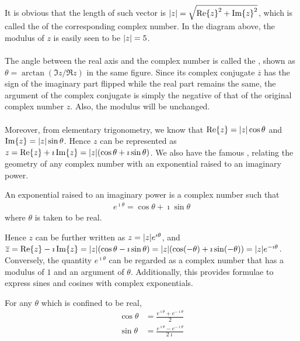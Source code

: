 It is obvious that the length of such vector is $\abs{z} = \sqrt{\Re{z}^2 + \Im{z}^2}$, which is called the  of the corresponding complex number. In the diagram above, the modulus of $z$ is easily seen to be $\abs{z} = 5$. \\
\\
The angle between the real axis and the complex number is called the , shown as $\theta = \arctan(\Im{z}/\Re{z})$ in the same figure. Since its complex conjugate $\overline{z}$ has the sign of the imaginary part flipped while the real part remains the same, the argument of the complex conjugate is simply the negative of that of the original complex number $z$. Also, the modulus will be unchanged.\\
\\
Moreover, from elementary trigonometry, we know that $\Re{z} = \abs{z} \cos{\theta}$ and $\Im{z} = \abs{z} \sin{\theta}$. Hence $z$ can be represented as $z = \Re{z} + \imath\Im{z} = \abs{z} (\cos \theta + \imath \sin \theta)$. We also have the famous , relating the geometry of any complex number with an exponential raised to an imaginary power.
\begin{defn}
\label{defn:Euler}
An exponential raised to an imaginary power is a complex number such that
\begin{align*}
e^{\imath \theta} = \cos \theta + \imath \sin \theta
\end{align*}
where $\theta$ is taken to be real.
\end{defn}
Hence $z$ can be further written as $z = \abs{z} e^{\imath \theta}$, and $\overline{z} = \Re{z} - \imath\Im{z} = \abs{z} (\cos \theta - \imath \sin \theta) = \abs{z} (\cos (-\theta) + \imath \sin (-\theta)) = \abs{z} e^{-\imath \theta}$. Conversely, the quantity $e^{\imath \theta}$ can be regarded as a complex number that has a modulus of $1$ and an argument of $\theta$. Additionally, this provides formulae to express sines and cosines with complex exponentials.
\begin{proper}
\label{proper:sincoscomplex}
For any $\theta$ which is confined to be real,
\begin{align*}
\cos \theta &= \frac{e^{\imath\theta} + e^{-\imath\theta}}{2} \\
\sin \theta &= \frac{e^{\imath\theta} - e^{-\imath\theta}}{2\imath}
\end{align*}
\end{proper}
